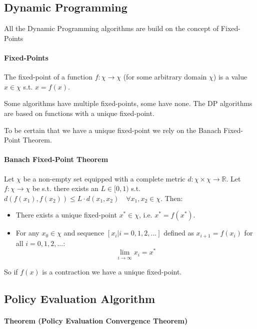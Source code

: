 \documentclass[11pt]{article}
\begin{document}
\maketitle
\thispagestyle{first}

\subsection*{Dynamic Programming}
All the Dynamic Programming algorithms are build on the concept of Fixed-Points

\paragraph*{Fixed-Points}
The fixed-point of a function $f:\chi\rightarrow\chi$ (for some arbitrary domain $\chi$) is a value $x\in\chi$ s.t. $x = f(x)$.

Some algorithms have multiple fixed-points, some have none. The DP algorithms are based on functions with a unique fixed-point. 

To be certain that we have a unique fixed-point we rely on the Banach Fixed-Point Theorem.
\paragraph*{Banach Fixed-Point Theorem}
Let $\chi$ be a non-empty set equipped with a complete metric $d:\chi\times\chi\rightarrow\mathbb{R}$. Let $f:\chi\rightarrow\chi$ be s.t. there exists an $L\in[0, 1)$ s.t. $d(f(x_1), f(x_2))\leq L\cdot d(x_1, x_2)\quad\forall x_1, x_2\in \chi$. Then:
\begin{itemize}
    \item There exists a unique fixed-point $x^*\in\chi$, i.e. $x^* = f(x^*)$.
    \item For any $x_0\in\chi$ and sequence $[x_i|i = 0, 1, 2, ...]$ defined as $x_{i+1} = f(x_i)$ for all $i = 0, 1, 2, ...$:
    $$
    \lim_{i\rightarrow\infty} x_i = x^*
    $$
\end{itemize}
So if $f(x)$ is a contraction we have a unique fixed-point.

\subsection*{Policy Evaluation Algorithm}
\paragraph*{Theorem (Policy Evaluation Convergence Theorem)}
\end{document}
